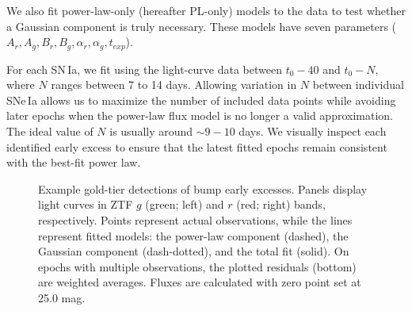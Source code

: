 \documentclass[twocolumn,twocolappendix, linenumbers]{aastex631} %
\begin{document}
We also fit power-law-only (hereafter PL-only) models to the data to test whether a Gaussian component is truly necessary.  These models have seven parameters ($A_r, A_g, B_r, B_g, \alpha_r, \alpha_g, t_{exp}$).

For each SN\,Ia, we fit using the light-curve data between $t_0 - 40$ and $t_0 - N$, where $N$ ranges between 7 to 14 days. Allowing variation in $N$ between individual SNe\,Ia allows us to maximize the number of included data points while avoiding later epochs when the power-law flux model is no longer a valid approximation. The ideal value of $N$ is usually around $\sim 9-10$ days.  We visually inspect each identified early excess to ensure that the latest fitted epochs remain consistent with the best-fit power law.


\begin{figure}
     \centering
     \hfill
     
        \caption{Example gold-tier detections of bump early excesses. Panels display light curves in ZTF $g$ (green; left) and $r$ (red; right) bands, respectively. Points represent actual observations, while the lines represent fitted models: the power-law component (dashed), the Gaussian component (dash-dotted), and the total fit (solid). On epochs with multiple observations, the plotted residuals (bottom) are weighted averages. Fluxes are calculated with zero point set at 25.0 mag.}
        \label{fig:detection}
\end{figure}
\end{document}
